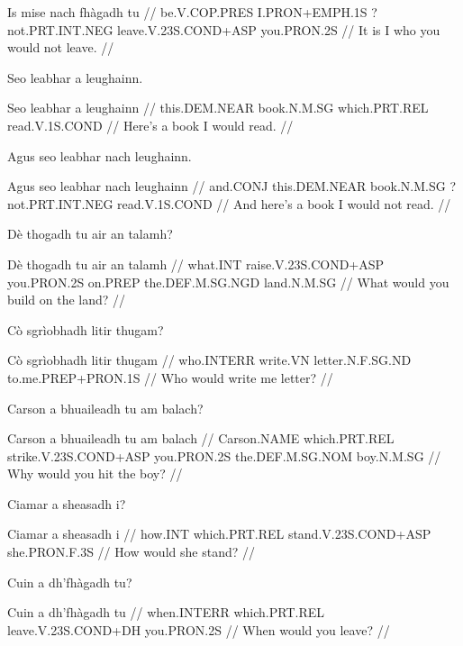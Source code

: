 \documentclass[a4paper,10pt]{article}
\begin{document}
\vspace{4mm}
\gla Is mise nach fhàgadh tu  //
\glb be.V.COP.PRES I.PRON+EMPH.1S ?not.PRT.INT.NEG leave.V.23S.COND+ASP you.PRON.2S  //
\glft It is I who you would not leave. //
\endgl
\xe

\ex
\begingl
\glpre Seo leabhar a leughainn. 

\vspace{4mm}
\gla Seo leabhar a leughainn  //
\glb this.DEM.NEAR book.N.M.SG which.PRT.REL read.V.1S.COND  //
\glft Here's a book I would read. //
\endgl
\xe

\ex
\begingl
\glpre Agus seo leabhar nach leughainn. 

\vspace{4mm}
\gla Agus seo leabhar nach leughainn  //
\glb and.CONJ this.DEM.NEAR book.N.M.SG ?not.PRT.INT.NEG read.V.1S.COND  //
\glft And here's a book I would not read. //
\endgl
\xe

\ex
\begingl
\glpre Dè thogadh tu air an talamh? 

\vspace{4mm}
\gla Dè thogadh tu air an talamh  //
\glb what.INT raise.V.23S.COND+ASP you.PRON.2S on.PREP the.DEF.M.SG.NGD land.N.M.SG  //
\glft What would you build on the land? //
\endgl
\xe

\ex
\begingl
\glpre Cò sgrìobhadh litir thugam? 

\vspace{4mm}
\gla Cò sgrìobhadh litir thugam  //
\glb who.INTERR write.VN letter.N.F.SG.ND to.me.PREP+PRON.1S  //
\glft Who would write me letter? //
\endgl
\xe

\ex
\begingl
\glpre Carson a bhuaileadh tu am balach? 

\vspace{4mm}
\gla Carson a bhuaileadh tu am balach  //
\glb Carson.NAME which.PRT.REL strike.V.23S.COND+ASP you.PRON.2S the.DEF.M.SG.NOM boy.N.M.SG  //
\glft Why would you hit the boy? //
\endgl
\xe

\ex
\begingl
\glpre Ciamar a sheasadh i? 

\vspace{4mm}
\gla Ciamar a sheasadh i  //
\glb how.INT which.PRT.REL stand.V.23S.COND+ASP she.PRON.F.3S  //
\glft How would she stand? //
\endgl
\xe

\ex
\begingl
\glpre Cuin a dh'fhàgadh tu? 

\vspace{4mm}
\gla Cuin a dh'fhàgadh tu  //
\glb when.INTERR which.PRT.REL leave.V.23S.COND+DH you.PRON.2S  //
\glft When would you leave? //
\endgl
\xe
\end{document}
